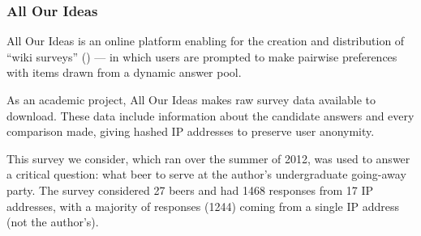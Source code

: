 \subsubsection{All Our Ideas}
All Our Ideas is an online platform enabling for the creation and distribution of ``wiki surveys'' (\cite{salganik:2015}) --- in which users are prompted to make pairwise preferences with items drawn from a dynamic answer pool.

As an academic project, All Our Ideas makes raw survey data available to download.
These data include information about the candidate answers and every comparison made, giving hashed IP addresses to preserve user anonymity.

This survey we consider, which ran over the summer of 2012, was used to answer a critical question: what beer to serve at the author's undergraduate going-away party.
The survey considered 27 beers and had 1468 responses from 17 IP addresses, with a majority of responses (1244) coming from a single IP address (not the author's).

